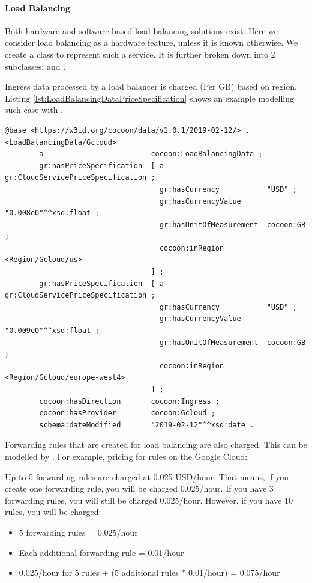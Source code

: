 \paragraph{Load Balancing}
\label{sec:LoadBalancing}
Both hardware and software-based load balancing solutions exist. 
Here we consider load balancing as a hardware feature, unless it is known otherwise.
We create a class  to represent such a service.
It is further broken down into 2 subclasses:  and
.

Ingress data processed by a load balancer is charged (Per GB) based on region.
Listing \ref{lst:LoadBalancingDataPriceSpecification} shows an example modelling such case with .
\begin{lstlisting}[caption={Load Balancing Data Price Specification},label={lst:LoadBalancingDataPriceSpecification}]
@base <https://w3id.org/cocoon/data/v1.0.1/2019-02-12/> .
<LoadBalancingData/Gcloud>
        a                         cocoon:LoadBalancingData ;
        gr:hasPriceSpecification  [ a                        gr:CloudServicePriceSpecification ;
                                    gr:hasCurrency           "USD" ;
                                    gr:hasCurrencyValue      "0.008e0"^^xsd:float ;
                                    gr:hasUnitOfMeasurement  cocoon:GB ;
                                    cocoon:inRegion         <Region/Gcloud/us>
                                  ] ;
        gr:hasPriceSpecification  [ a                        gr:CloudServicePriceSpecification ;
                                    gr:hasCurrency           "USD" ;
                                    gr:hasCurrencyValue      "0.009e0"^^xsd:float ;
                                    gr:hasUnitOfMeasurement  cocoon:GB ;
                                    cocoon:inRegion         <Region/Gcloud/europe-west4>
                                  ] ;
        cocoon:hasDirection       cocoon:Ingress ;
        cocoon:hasProvider        cocoon:Gcloud ;
        schema:dateModified       "2019-02-12"^^xsd:date .
\end{lstlisting}

Forwarding rules that are created for load balancing are also charged.
This can be modelled by .
For example, pricing for rules on the Google Cloud:

\begin{displayquote}
Up to 5 forwarding rules are charged at 0.025 USD/hour. That means, if you create one forwarding rule, you will be charged 0.025/hour. If you have 3 forwarding rules, you will still be charged 0.025/hour.
However, if you have 10 rules, you will be charged:
\begin{itemize}
  \item[] 5 forwarding rules = 0.025/hour
  \item[] Each additional forwarding rule = 0.01/hour
  \item[] 0.025/hour for 5 rules + (5 additional rules * 0.01/hour) = 0.075/hour
\end{itemize}
\end{displayquote}

